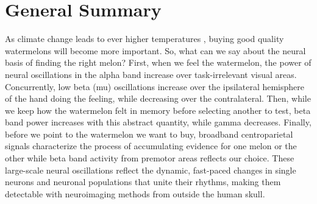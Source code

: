 \section{General Summary}
As climate change leads to ever higher temperatures \parencite{Parmesan2003}, buying good quality watermelons will become more important. So, what can we say about the neural basis of finding the right melon? First, when we feel the watermelon, the power of neural oscillations in the alpha band increase over task-irrelevant visual areas. Concurrently, low beta (mu) oscillations increase over the ipsilateral hemisphere of the hand doing the feeling, while decreasing over the contralateral. Then, while we keep how the watermelon felt in memory before selecting another to test, beta band power increases with this abstract quantity, while gamma decreases. Finally, before we point to the watermelon we want to buy, broadband centroparietal signals characterize the process of accumulating evidence for one melon or the other while beta band activity from premotor areas reflects our choice. These large-scale neural oscillations reflect the dynamic, fast-paced changes in single neurons and neuronal populations that unite their rhythms, making them detectable with neuroimaging methods from outside the human skull. 
